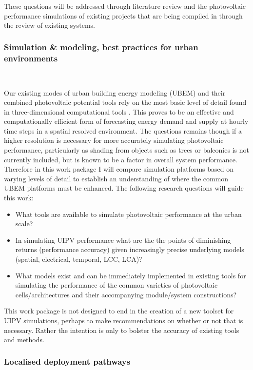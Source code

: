 These questions will be addressed through literature review and the photovoltaic performance simulations of existing projects that are being compiled in through the review of existing systems. 


\subsubsection{Simulation \& modeling, best practices for urban environments}\

Our existing modes of urban building energy modeling (UBEM) and their combined photovoltaic potential tools rely on the most basic level of detail found in three-dimensional computational tools \cite{fonseca_city_2016}. This proves to be an effective and computationally efficient form of forecasting energy demand and supply at hourly time steps in a spatial resolved environment. The questions remains though if a higher resolution is necessary for more accurately simulating photovoltaic performance, particularly as shading from objects such as trees or balconies is not currently included, but is known to be a factor in overall system performance. Therefore in this work package I will compare simulation platforms based on varying levels of detail to establish an understanding of where the common UBEM platforms must be enhanced. The following research questions will guide this work:
\begin{itemize}
    \item What tools are available to simulate photovoltaic performance at the urban scale?
    \item In simulating UIPV performance what are the the points of diminishing returns (performance accuracy) given increasingly precise underlying models (spatial, electrical, temporal, LCC, LCA)?
    \item What models exist and can be immediately implemented in existing tools for simulating the performance of the common varieties of photovoltaic cells/architectures and their accompanying module/system constructions?
\end{itemize}

This work package is not designed to end in the creation of a new toolset for UIPV simulations, perhaps to make recommendations on whether or not that is necessary. Rather the intention is only to bolster the accuracy of existing tools and methods. 

\subsubsection{Localised deployment pathways}\

